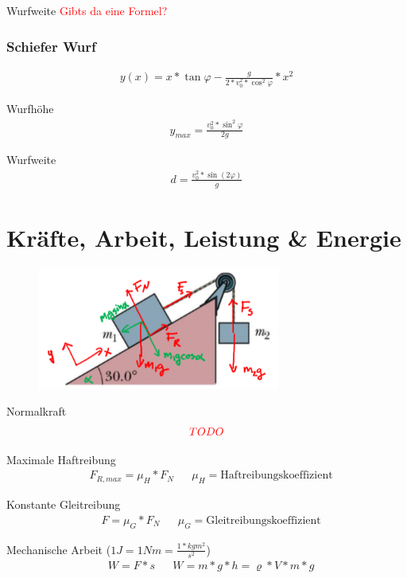 \documentclass[17pt]{extarticle}
\begin{document}
	Wurfweite
	\textcolor{red}{Gibts da eine Formel?}
	
	\subsubsection{Schiefer Wurf}
	\begin{align}
		y(x) = x * \tan \varphi - \frac{g}{2 * v_{0}^{2} * \cos^{2} \varphi} * x^{2}
	\end{align}
	
	Wurfhöhe
	\begin{align}
		y_{max} = \frac{v_{0}^{2} * \sin^{2} \varphi}{2g}
	\end{align}
	
	Wurfweite
	\begin{align}
		d = \frac{v_{0}^{2} * \sin(2\varphi)}{g}
	\end{align}

\section{Kräfte, Arbeit, Leistung \& Energie}
	\begin{figure}[h!]
		\centering
		\includegraphics[width=8cm]{img/Haftreibung.png}
	\end{figure}
	
	Normalkraft
	\begin{align}
		\textcolor{red}{TODO}
	\end{align}
	
	Maximale Haftreibung
	\begin{align}
		&F_{R,max} = \mu_{H} * F_{N}
		&&\mu_{H} = \text{Haftreibungskoeffizient} 
	\end{align}

	Konstante Gleitreibung
	\begin{align}
		&F = \mu_{G} * F_{N}
		&&\mu_{G} = \text{Gleitreibungskoeffizient}		
	\end{align}

	Mechanische Arbeit \small{($1J = 1Nm = \frac{1*kg m^{2}}{s^{2}}$)}
	\begin{align}
		&W = F * s 
		&&W = m * g * h = \varrho * V * m * g
	\end{align}
\end{document}
